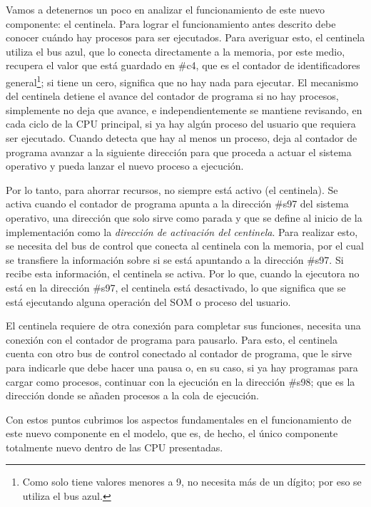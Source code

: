\documentclass[letterpaper,12pt,oneside]{book}
\begin{document}
		
		
	
  		Vamos a detenernos un poco en analizar el funcionamiento de este nuevo componente: el centinela. Para lograr
  		el funcionamiento antes descrito debe conocer cuándo hay procesos para ser ejecutados.
  		Para averiguar esto, el centinela utiliza el bus azul, que lo conecta directamente a la memoria,
		por este medio, recupera el valor que está guardado en \#c4, que es el contador de identificadores general\footnote{Como solo tiene valores 
		menores a 9,
		no necesita más de un dígito; por eso se utiliza el bus azul.}; si tiene un cero, significa que no hay nada para ejecutar.
		El mecanismo del centinela detiene el avance del contador de programa si no hay procesos, simplemente no
		deja que avance, e independientemente
		se mantiene revisando, en cada ciclo de la CPU principal, si ya hay algún proceso del usuario que requiera
		ser ejecutado. Cuando detecta que hay
		al menos un proceso, deja al contador de programa avanzar a la siguiente dirección para que proceda a actuar el sistema operativo
		y pueda lanzar el nuevo proceso a ejecución.
		
		Por lo tanto, para ahorrar recursos, no siempre está activo (el centinela). Se 
		activa cuando el contador de programa apunta a la dirección \#s97 del sistema operativo, una dirección que solo sirve como parada y que se 
		define 
		al inicio de la implementación como la \textit{dirección de activación del centinela}. 
		Para realizar esto, se necesita del  bus de control que conecta al centinela con la memoria, por el cual se transfiere 
		la información sobre si se está 
		apuntando a la dirección \#s97. Si recibe esta información, el centinela se activa. Por lo que, cuando la ejecutora no está
		en la dirección \#s97, el centinela está desactivado, lo que significa que se está ejecutando alguna operación 
		del SOM o
		proceso del usuario.
		
		El centinela requiere de otra conexión para completar sus funciones, necesita una conexión con el contador
		de programa para pausarlo. Para esto, el centinela cuenta con otro bus de control conectado al contador
		de programa, que le sirve para indicarle que debe hacer una pausa o, en su 
		caso, si
		ya hay programas para cargar como procesos, continuar con la ejecución en la dirección \#s98; que es la dirección donde
		se añaden procesos a la cola de ejecución. 
		
		Con estos puntos cubrimos los aspectos fundamentales en el funcionamiento
		de este nuevo componente en el modelo, que es, de hecho, el único componente totalmente nuevo dentro
		de las CPU presentadas.
	 	 	
\end{document}
